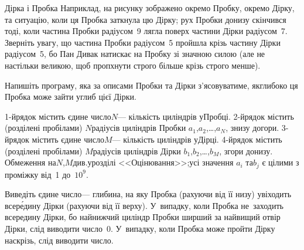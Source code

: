 \begin{problemAllDefault}{Дірка і Пробка}
Наприклад, на рисунку зображено окремо Пробку, окремо Дірку, та ситуацію, коли ця Пробка заткнула цю Дірку; рух Пробки донизу скінчився тоді, коли частина Пробки радіусом~9 лягла поверх частини Дірки радіусом~7. 
Зверніть увагу, що частина Пробки радіусом~5 пройшла крізь частину Дірки радіусом~5, бо Пан Дивак натискає на Пробку зі значною силою (але не настільки великою, щоб пропхнути строго більше крізь строго менше).



Напишіть програму, яка за описами Пробки та Дірки з'ясовуватиме, як\nolinebreak[3] глибоко ця Пробка може зайти углиб цієї Дірки.

\InputFile
\mbox{1-й}\nolinebreak[3] рядок містить єдине число\nolinebreak[3] $N$\nolinebreak[3] --- кількість циліндрів у\nolinebreak[3] Пробці. \mbox{2-й}\nolinebreak[3] рядок містить (розділені пробілами) $N$\nolinebreak[3] радіусів циліндрів Пробки $a_1$,\nolinebreak[1] $a_2$,\nolinebreak[3] \dots,\nolinebreak[2] $a_N$, знизу догори. 
\mbox{3-й}\nolinebreak[3] рядок містить єдине число\nolinebreak[3] $M$\nolinebreak[3] --- кількість циліндрів у\nolinebreak[3] Дірці. \mbox{4-й}\nolinebreak[3] рядок містить (розділені пробілами) $M$\nolinebreak[3] радіусів циліндрів Дірки $b_1$,\nolinebreak[1] $b_2$,\nolinebreak[3] \dots,\nolinebreak[2] $b_M$, згори донизу. Обмеження на\nolinebreak[2] $N$,\nolinebreak[2] $M$\linebreak[2] див.\nolinebreak[2] у\nolinebreak[2] розділі <<Оцінювання>>;\linebreak[2] усі значення $a_i$ та\nolinebreak[3] $b_j$ є цілими з проміжку від~1 до~$10^9$.


\OutputFile
Виведіть єдине число\nolinebreak[3] --- глибина, на яку Пробка (рахуючи від її низу) увіходить всер\'{е}дину Дірки (рахуючи від її верху). У~випадку, коли Пробка не~заходить всередину Дірки, бо найнижчий циліндр Пробки ширший за найвищий отвір Дірки, слід виводити число~0. У~випадку, коли Пробка може пройти Дірку наскрізь, слід виводити число.



\end{problemAllDefault}
